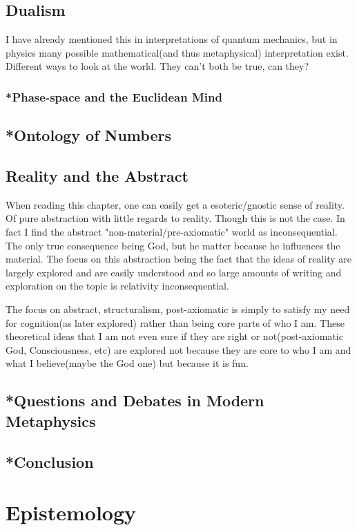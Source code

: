 \section{Dualism}
\par I have already mentioned this in interpretations of quantum mechanics, but in physics many possible mathematical(and thus metaphysical) interpretation exist. Different ways to look at the world. They can't both be true, can they?
\subsection{*Phase-space and the Euclidean Mind}
\section{*Ontology of Numbers}
\section{Reality and the Abstract}
\par When reading this chapter, one can easily get a esoteric/gnostic sense of reality. Of pure abstraction with little regards to reality. Though this is not the case. In fact I find the abstract "non-material/pre-axiomatic" world as inconsequential. The only true consequence being God, but he matter because he influences the material. The focus on this abstraction being the fact that the ideas of reality are largely explored and are easily understood and so large amounts of writing and exploration on the topic is relativity inconsequential.
\par The focus on abstract, structuralism, post-axiomatic is simply to satisfy my need for cognition(as later explored) rather than being core parts of who I am.  These theoretical ideas that I am not even sure if they are right or not(post-axiomatic God, Consciousness, etc) are explored not because they are core to who I am and what I believe(maybe the God one) but because it is fun.
\section{*Questions and Debates in Modern Metaphysics}
\section{*Conclusion}
\chapter{Epistemology}

